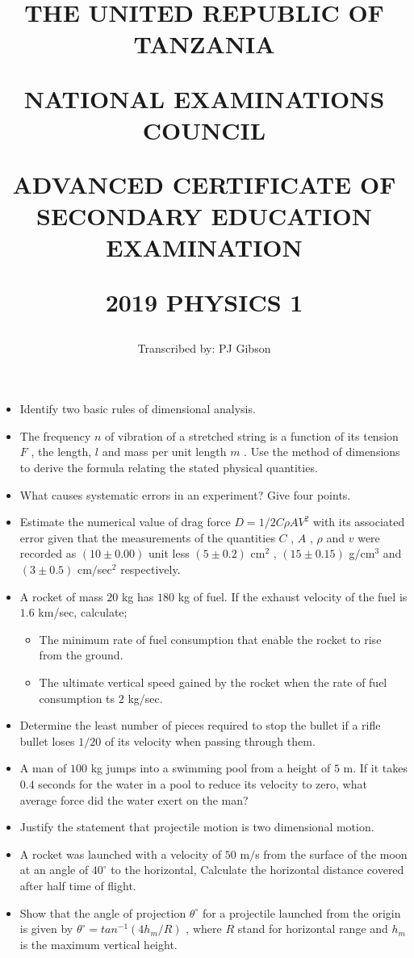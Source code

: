 \documentclass{article}
\title{THE UNITED REPUBLIC OF TANZANIA

NATIONAL EXAMINATIONS COUNCIL

ADVANCED CERTIFICATE OF SECONDARY EDUCATION EXAMINATION

\textbf{2019 PHYSICS 1}}
\author{Transcribed by:  PJ Gibson}
\begin{document}
\maketitle

\begin{itemize}
\item Identify two basic rules of dimensional analysis.
\item The frequency $ n$ of vibration of a stretched string is a function of its tension $ F$ , the length, $ l$ and mass per unit length $ m$ . Use the method of dimensions to derive the formula relating the stated physical quantities.
\item What causes systematic errors in an experiment? Give four points. 
\item Estimate the numerical value of drag force $ D= 1/2 C \rho  A V^{2}$ with its associated error given that the measurements of the quantities $ C$ , $ A$ , $ \rho $ and $ v$ were recorded as $ (10\pm 0.00)$ unit less $ (5\pm 0.2) $ cm$ ^{2}$ , $ (15\pm 0.15)$ g$/$cm$ ^{3}$ and $ (3\pm 0.5)$ cm$/$sec$ ^{2}$ respectively. 
\item A rocket of mass $ 20$ kg has $ 180$ kg of fuel. If the exhaust velocity of the fuel is $ 1.6$ km/sec, calculate;
 \begin{itemize}
\item The minimum rate of fuel consumption that enable the rocket to rise from the ground. 
\item The ultimate vertical speed gained by the rocket when the rate of fuel consumption ts $ 2$ kg/sec. 
\end{itemize}
\item Determine the least number of pieces required to stop the bullet if a rifle bullet loses $ 1/20$ of its velocity when passing through them.
\item A man of $ 100$ kg jumps into a swimming pool from a height of $ 5$ m. If it takes $ 0.4$ seconds for the water in a pool to reduce its velocity to zero, what average force did  the water exert on the man? 
\item Justify the statement that projectile motion is two dimensional motion.
\item A rocket was launched with a velocity of $ 50$ m$/$s from the surface of the moon at an angle of $ 40^{\circ}$ to the horizontal, Calculate the horizontal distance covered  after half time of flight.
\item Show that the angle of projection $ \theta ^{\circ}$ for a projectile launched from the origin is given by $ \theta ^{\circ}= tan^{-1}(4h_{m}/R)$ , where $ R$ stand for horizontal range and $ h_{m}$ is the maximum vertical height.

\end{itemize}
\end{document}
